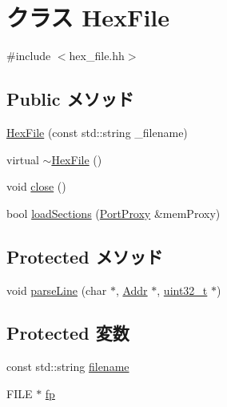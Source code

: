 \hypertarget{classHexFile}{
\section{クラス HexFile}
\label{classHexFile}
}


{\ttfamily \#include $<$hex\_\-file.hh$>$}\subsection*{Public メソッド}
\begin{DoxyCompactItemize}
\item 
\hyperlink{classHexFile_a33e7f7c56c9fb712309be679983e06a4}{HexFile} (const std::string \_\-filename)
\item 
virtual \hyperlink{classHexFile_af446931b55a207b6e7e8f0b1795ee2a3}{$\sim$HexFile} ()
\item 
void \hyperlink{classHexFile_a5ae591df94fc66ccb85cbb6565368bca}{close} ()
\item 
bool \hyperlink{classHexFile_a767f217f0e08a42dbda4b40f1c827c61}{loadSections} (\hyperlink{classPortProxy}{PortProxy} \&memProxy)
\end{DoxyCompactItemize}
\subsection*{Protected メソッド}
\begin{DoxyCompactItemize}
\item 
void \hyperlink{classHexFile_a391ff17c7683a3c9967247e7550897c9}{parseLine} (char $\ast$, \hyperlink{base_2types_8hh_af1bb03d6a4ee096394a6749f0a169232}{Addr} $\ast$, \hyperlink{Type_8hh_a435d1572bf3f880d55459d9805097f62}{uint32\_\-t} $\ast$)
\end{DoxyCompactItemize}
\subsection*{Protected 変数}
\begin{DoxyCompactItemize}
\item 
const std::string \hyperlink{classHexFile_a42a21beb8018ac623f4d09db1343b9cf}{filename}
\item 
FILE $\ast$ \hyperlink{classHexFile_aa065f30aa9f5f9a42132c82c787ee70b}{fp}
\end{DoxyCompactItemize}



